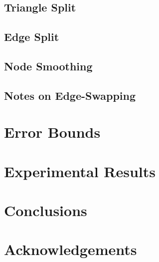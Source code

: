 \documentclass[11pt]{article}
\begin{document}
\subsection{Triangle Split}
\subsection{Edge Split}
\subsection{Node Smoothing}
\subsection{Notes on Edge-Swapping}
\section{Error Bounds}
\section{Experimental Results}
\section{Conclusions}
\section{Acknowledgements}
\end{document}
